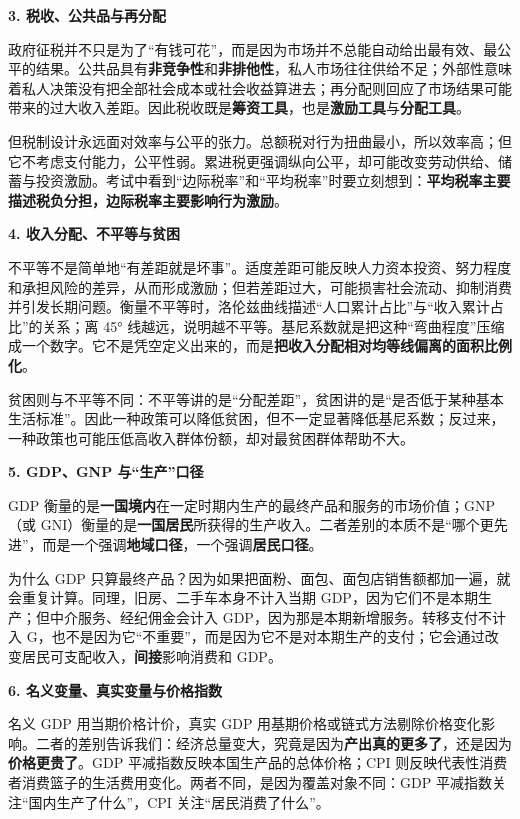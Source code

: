 \textbf{3. 税收、公共品与再分配}

政府征税并不只是为了“有钱可花”，而是因为市场并不总能自动给出最有效、最公平的结果。公共品具有\textbf{非竞争性}和\textbf{非排他性}，私人市场往往供给不足；外部性意味着私人决策没有把全部社会成本或社会收益算进去；再分配则回应了市场结果可能带来的过大收入差距。因此税收既是\textbf{筹资工具}，也是\textbf{激励工具}与\textbf{分配工具}。

但税制设计永远面对效率与公平的张力。总额税对行为扭曲最小，所以效率高；但它不考虑支付能力，公平性弱。累进税更强调纵向公平，却可能改变劳动供给、储蓄与投资激励。考试中看到“边际税率”和“平均税率”时要立刻想到：\textbf{平均税率主要描述税负分担，边际税率主要影响行为激励}。

\textbf{4. 收入分配、不平等与贫困}

不平等不是简单地“有差距就是坏事”。适度差距可能反映人力资本投资、努力程度和承担风险的差异，从而形成激励；但若差距过大，可能损害社会流动、抑制消费并引发长期问题。衡量不平等时，洛伦兹曲线描述“人口累计占比”与“收入累计占比”的关系；离 45° 线越远，说明越不平等。基尼系数就是把这种“弯曲程度”压缩成一个数字。它不是凭空定义出来的，而是\textbf{把收入分配相对均等线偏离的面积比例化}。

贫困则与不平等不同：不平等讲的是“分配差距”，贫困讲的是“是否低于某种基本生活标准”。因此一种政策可以降低贫困，但不一定显著降低基尼系数；反过来，一种政策也可能压低高收入群体份额，却对最贫困群体帮助不大。

\textbf{5. GDP、GNP 与“生产”口径}

GDP 衡量的是\textbf{一国境内}在一定时期内生产的最终产品和服务的市场价值；GNP（或 GNI）衡量的是\textbf{一国居民}所获得的生产收入。二者差别的本质不是“哪个更先进”，而是一个强调\textbf{地域口径}，一个强调\textbf{居民口径}。

为什么 GDP 只算最终产品？因为如果把面粉、面包、面包店销售额都加一遍，就会重复计算。同理，旧房、二手车本身不计入当期 GDP，因为它们不是本期生产；但中介服务、经纪佣金会计入 GDP，因为那是本期新增服务。转移支付不计入 G，也不是因为它“不重要”，而是因为它不是对本期生产的支付；它会通过改变居民可支配收入，\textbf{间接}影响消费和 GDP。

\textbf{6. 名义变量、真实变量与价格指数}

名义 GDP 用当期价格计价，真实 GDP 用基期价格或链式方法剔除价格变化影响。二者的差别告诉我们：经济总量变大，究竟是因为\textbf{产出真的更多了}，还是因为\textbf{价格更贵了}。GDP 平减指数反映本国生产品的总体价格；CPI 则反映代表性消费者消费篮子的生活费用变化。两者不同，是因为覆盖对象不同：GDP 平减指数关注“国内生产了什么”，CPI 关注“居民消费了什么”。


